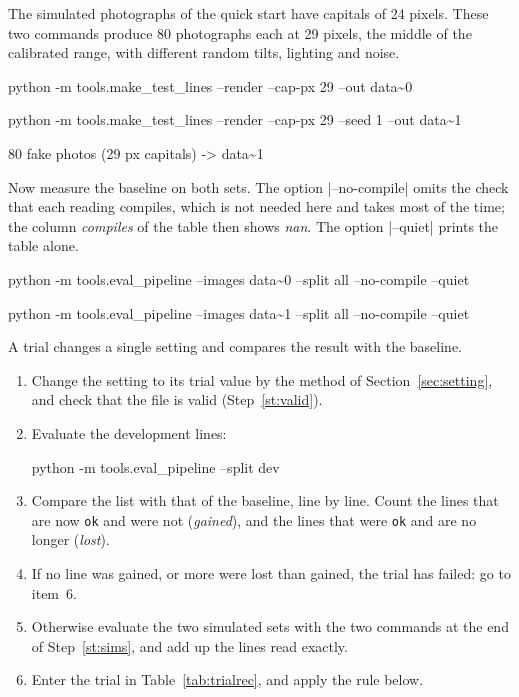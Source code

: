 \label{st:sims}
The simulated photographs of the quick start have capitals of 24 pixels. These two commands
produce 80 photographs each at 29 pixels, the middle of the calibrated range, with different
random tilts, lighting and noise.
\begin{ps}
python -m tools.make_test_lines --render --cap-px 29 --out data\sim0
\end{ps}
\begin{ps}
python -m tools.make_test_lines --render --cap-px 29 --seed 1 --out data\sim1
\end{ps}
\begin{out}
80 fake photos (29 px capitals) -> data\sim1
\end{out}
Now measure the baseline on both sets. The option \code|--no-compile| omits the check that each
reading compiles, which is not needed here and takes most of the time; the column
\emph{compiles} of the table then shows \emph{nan}. The option \code|--quiet| prints the table
alone.
\begin{ps}
python -m tools.eval_pipeline --images data\sim0 --split all --no-compile --quiet
\end{ps}
\begin{ps}
python -m tools.eval_pipeline --images data\sim1 --split all --no-compile --quiet
\end{ps}

\label{st:trial}
A trial changes a single setting and compares the result with the baseline.
\begin{enumerate}
\item Change the setting to its trial value by the method of Section~\ref{sec:setting}, and
  check that the file is valid (Step~\ref{st:valid}).
\item Evaluate the development lines:
\begin{ps}
python -m tools.eval_pipeline --split dev
\end{ps}
\item Compare the list with that of the baseline, line by line. Count the lines that are now
  \texttt{ok} and were not (\emph{gained}), and the lines that were \texttt{ok} and are no
  longer (\emph{lost}).
\item If no line was gained, or more were lost than gained, the trial has failed: go to item~6.
\item Otherwise evaluate the two simulated sets with the two commands at the end of
  Step~\ref{st:sims}, and add up the lines read exactly.
\item Enter the trial in Table~\ref{tab:trialrec}, and apply the rule below.
\end{enumerate}

